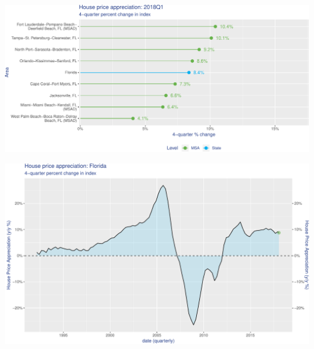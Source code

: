 \documentclass[]{article}
\begin{document}
~

\includegraphics{Florida_pricing_files/figure-latex/MonthsOffer-1.pdf}

\newpage

\thispagestyle{contentpage}
\fontsize{8pt}{12pt}\selectfont{}
\includegraphics{Florida_pricing_files/figure-latex/MonthsOffer2-1.pdf}

\newpage

\thispagestyle{contentpage}
\fontsize{8pt}{12pt}\selectfont{}
\end{document}
